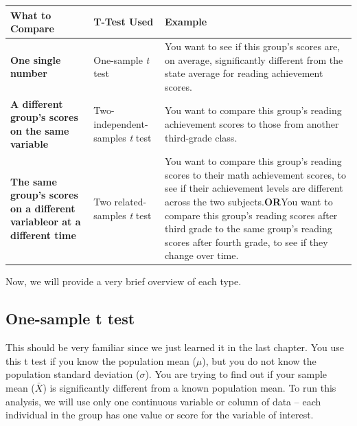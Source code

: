 \documentclass[
  letterpaper,
  DIV=11,
  numbers=noendperiod]{scrreprt}
\begin{document}
\begin{longtable}[]{@{}
  >{\raggedright\arraybackslash}p{}
  >{\raggedright\arraybackslash}p{}
  >{\raggedright\arraybackslash}p{}@{}}
\toprule\noalign{}
\begin{minipage}[b]{\linewidth}\raggedright
What to Compare
\end{minipage} & \begin{minipage}[b]{\linewidth}\raggedright
T-Test Used
\end{minipage} & \begin{minipage}[b]{\linewidth}\raggedright
Example
\end{minipage} \\
\midrule\noalign{}
\endhead
\bottomrule\noalign{}
\endlastfoot
\textbf{One single number} & One-sample \emph{t} test & You want to see
if this group's scores are, on average, significantly different from the
state average for reading achievement scores. \\
\textbf{A different group's scores on the same variable} &
Two-independent-samples \emph{t} test & You want to compare this group's
reading achievement scores to those from another third-grade class. \\
\textbf{The same group's scores on a different variableor at a different
time} & Two related-samples \emph{t} test & You want to compare this
group's reading scores to their math achievement scores, to see if their
achievement levels are different across the two subjects.\textbf{OR}You
want to compare this group's reading scores after third grade to the
same group's reading scores after fourth grade, to see if they change
over time. \\
\end{longtable}

Now, we will provide a very brief overview of each type.

\subsection{One-sample t test}\label{one-sample-t-test-1}

This should be very familiar since we just learned it in the last
chapter. You use this t test if you know the population mean (\(\mu\)),
but you do not know the population standard deviation (\(\sigma\)). You
are trying to find out if your sample mean (\(\bar{X}\)) is
significantly different from a known population mean. To run this
analysis, we will use only one continuous variable or column of data --
each individual in the group has one value or score for the variable of
interest.
\end{document}
